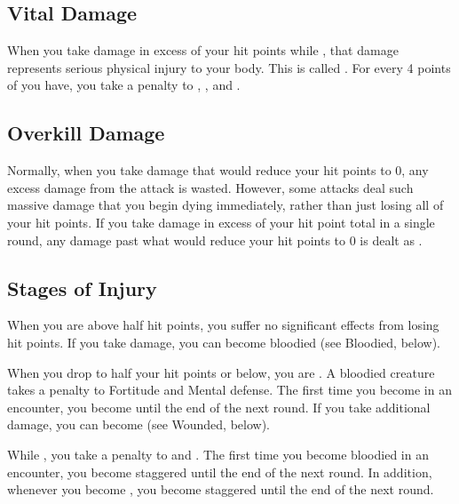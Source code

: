     \subsection{Vital Damage}\label{Vital Damage}
        When you take damage in excess of your hit points while , that damage represents serious physical injury to your body.
        This is called .
        For every 4 points of  you have, you take a  penalty to , , and .

    \subsection{Overkill Damage}\label{Overkill Damage}
        Normally, when you take damage that would reduce your hit points to 0, any excess damage from the attack is wasted.
        However, some attacks deal such massive damage that you begin dying immediately, rather than just losing all of your hit points.
        If you take damage in excess of your  hit point total in a single round, any damage past what would reduce your hit points to 0 is dealt as .

    \subsection{Stages of Injury}

         When you are above half hit points, you suffer no significant effects from losing hit points.
        If you take damage, you can become bloodied (see Bloodied, below).

         When you drop to half your hit points or below, you are \bloodied.
        A bloodied creature takes a  penalty to Fortitude and Mental defense.
        The first time you become  in an encounter, you become  until the end of the next round.
        If you take additional damage, you can become  (see Wounded, below).

        \label{Staggered}
        While , you take a  penalty to  and .
        The first time you become bloodied in an encounter, you become staggered until the end of the next round.
        In addition, whenever you become , you become staggered until the end of the next round.

